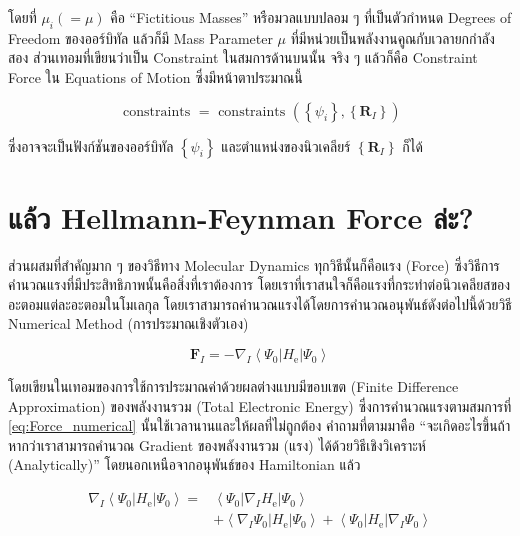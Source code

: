 \noindent โดยที่ $\mu_i(=\mu)$ คือ \enquote{Fictitious Masses} หรือมวลแบบปลอม ๆ ที่เป็นตัวกำหนด Degrees of Freedom
ของออร์บิทัล แล้วก็มี Mass Parameter $\mu$ ที่มีหน่วยเป็นพลังงานคูณกับเวลายกกำลังสอง ส่วนเทอมที่เขียนว่าเป็น Constraint ในสมการด้านบนนั้น
จริง ๆ แล้วก็คือ Constraint Force ใน Equations of Motion ซึ่งมีหน้าตาประมาณนี้

\begin{equation}
  \text{ constraints }
  =
  \text{ constraints }\left(\left\{\psi_i\right\},\left\{\mathbf{R}_I\right\}\right)
\end{equation}

\noindent ซึ่งอาจจะเป็นฟังก์ชันของออร์บิทัล $\left\{\psi_i\right\}$ และตำแหน่งของนิวเคลียร์ $\left\{\mathbf{R}_I\right\}$ ก็ได้

\section{แล้ว Hellmann-Feynman Force ล่ะ?}

ส่วนผสมที่สำคัญมาก ๆ ของวิธีทาง Molecular Dynamics ทุกวิธีนั้นก็คือแรง (Force) ซึ่งวิธีการคำนวณแรงที่มีประสิทธิภาพนั้นคือสิ่งที่เราต้องการ
โดยเราที่เราสนใจก็คือแรงที่กระทำต่อนิวเคลียสของอะตอมแต่ละอะตอมในโมเลกุล โดยเราสามารถคำนวณแรงได้โดยการคำนวณอนุพันธ์ดังต่อไปนี้ด้วยวิธี
Numerical Method (การประมาณเชิงตัวเอง)

\begin{equation}
  \label{eq:Force_numerical}
  \mathbf{F}_I
  =
  -\nabla_I\left\langle\Psi_0\left| H_{\mathrm{e}}\right| \Psi_0\right\rangle
\end{equation}

\noindent โดยเขียนในเทอมของการใช้การประมาณค่าด้วยผลต่างแบบมีขอบเขต (Finite Difference Approximation) ของพลังงานรวม
(Total Electronic Energy) ซึ่งการคำนวณแรงตามสมการที่ \eqref{eq:Force_numerical} นั้นใช้เวลานานและให้ผลที่ไม่ถูกต้อง
คำถามที่ตามมาคือ \enquote{จะเกิดอะไรขึ้นถ้าหากว่าเราสามารถคำนวณ Gradient ของพลังงานรวม (แรง) ได้ด้วยวิธีเชิงวิเคราะห์ (Analytically)}
โดยนอกเหนือจากอนุพันธ์ของ Hamiltonian แล้ว

\begin{align}
  \nabla_I\left\langle\Psi_0\left| H_{\mathrm{e}}\right| \Psi_0\right\rangle
  = & \left\langle\Psi_0\left|\nabla_I  H_{\mathrm{e}}\right| \Psi_0\right\rangle  \\
    & +\left\langle\nabla_I \Psi_0\left| H_{\mathrm{e}}\right| \Psi_0\right\rangle
  + \left\langle\Psi_0\left| H_{\mathrm{e}}\right| \nabla_I \Psi_0\right\rangle
\end{align}

